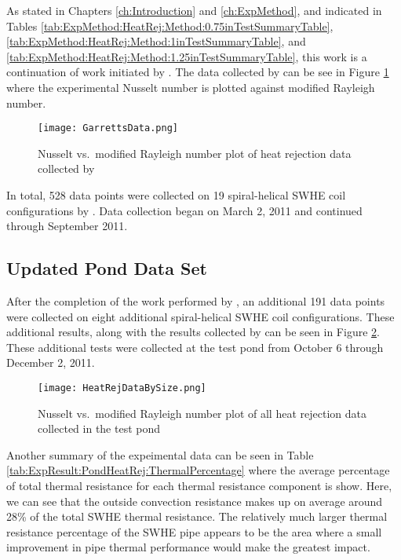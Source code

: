 As stated in Chapters \ref{ch:Introduction} and \ref{ch:ExpMethod}, and indicated in Tables \ref{tab:ExpMethod:HeatRej:Method:0.75inTestSummaryTable}, \ref{tab:ExpMethod:HeatRej:Method:1inTestSummaryTable}, and \ref{tab:ExpMethod:HeatRej:Method:1.25inTestSummaryTable}, this work is a continuation of work initiated by \cite{Hansen2011}. The data collected by \cite{Hansen2011} can be see in Figure \ref{fig:ExpResult:HeatRej:HansenData:NuVsRaGarrettData} where the experimental Nusselt number is plotted against modified Rayleigh number.

	\begin{figure}
		\centering
		\texttt{[image: GarrettsData.png]}
		\caption[Heat rejection data collected by \cite{Hansen2011}]{Nusselt vs.\ modified Rayleigh number plot of heat rejection data collected by \cite{Hansen2011}}
		\label{fig:ExpResult:HeatRej:HansenData:NuVsRaGarrettData}
	\end{figure}

In total, 528 data points were collected on 19 spiral-helical SWHE coil configurations by \cite{Hansen2011}. Data collection began on March 2, 2011 and continued through September 2011.

	\subsection{Updated Pond Data Set}
	\label{subsec:ExpResult:HeatRej:UpdatedData}

After the completion of the work performed by \cite{Hansen2011}, an additional 191 data points were collected on eight additional spiral-helical SWHE coil configurations. These additional results, along with the results collected by \cite{Hansen2011} can be seen in Figure \ref{fig:ExpResult:HeatRej:HansenData:AllPondHeatRejData}. These additional tests were collected at the test pond from October 6 through December 2, 2011.

	\begin{figure}
		\centering
		\texttt{[image: HeatRejDataBySize.png]}
		\caption[Updated pond heat rejection data]{Nusselt vs.\ modified Rayleigh number plot of all heat rejection data collected in the test pond}
		\label{fig:ExpResult:HeatRej:HansenData:AllPondHeatRejData}
	\end{figure}
	
Another summary of the expeimental data can be seen in Table \ref{tab:ExpResult:PondHeatRej:ThermalPercentage} where the average percentage of total thermal resistance for each thermal resistance component is show. Here, we can see that the outside convection resistance makes up on average around 28\% of the total SWHE thermal resistance. The relatively much larger thermal resistance percentage of the SWHE pipe appears to be the area where a small improvement in pipe thermal performance would make the greatest impact.
	

